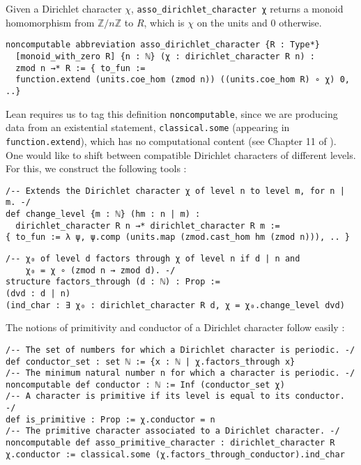 \documentclass[a4paper,UKenglish,cleveref, autoref, thm-restate,pdfa]{lipics-v2021}
\newcommand{\lean}[1]{\texttt{#1}\xspace} %
\begin{document}
Given a Dirichlet character $\chi$, \lean{asso\_dirichlet\_character χ} returns a monoid homomorphism from $\mathbb{Z}/n \mathbb{Z}$ 
to $R$, which is $\chi$ on the units and 0 otherwise. 
\begin{lstlisting}
noncomputable abbreviation asso_dirichlet_character {R : Type*} 
  [monoid_with_zero R] {n : ℕ} (χ : dirichlet_character R n) : 
  zmod n →* R := { to_fun := 
  function.extend (units.coe_hom (zmod n)) ((units.coe_hom R) ∘ χ) 0, ..}
\end{lstlisting}
Lean requires us to tag this definition \lean{noncomputable}, since we are producing data from an existential statement, 
\lean{classical.some} (appearing in \lean{function.extend}), which has no computational content (see Chapter 11 of \cite{TPIL}).
One would like to shift between compatible Dirichlet characters of different levels. For this, we construct the following tools : 
\begin{lstlisting}
/-- Extends the Dirichlet character χ of level n to level m, for n | m. -/
def change_level {m : ℕ} (hm : n | m) : 
  dirichlet_character R n →* dirichlet_character R m :=
{ to_fun := λ ψ, ψ.comp (units.map (zmod.cast_hom hm (zmod n))), .. }
\end{lstlisting}
\newpage
\begin{lstlisting}
/-- χ₀ of level d factors through χ of level n if d | n and 
    χ₀ = χ ∘ (zmod n → zmod d). -/
structure factors_through (d : ℕ) : Prop :=
(dvd : d | n) 
(ind_char : ∃ χ₀ : dirichlet_character R d, χ = χ₀.change_level dvd)
\end{lstlisting}
The notions of primitivity and conductor of a Dirichlet character follow easily : 
\begin{lstlisting}
/-- The set of numbers for which a Dirichlet character is periodic. -/
def conductor_set : set ℕ := {x : ℕ | χ.factors_through x}
/-- The minimum natural number n for which a character is periodic. -/
noncomputable def conductor : ℕ := Inf (conductor_set χ)
/-- A character is primitive if its level is equal to its conductor. -/
def is_primitive : Prop := χ.conductor = n
/-- The primitive character associated to a Dirichlet character. -/
noncomputable def asso_primitive_character : dirichlet_character R χ.conductor := classical.some (χ.factors_through_conductor).ind_char
\end{lstlisting}
\end{document}

